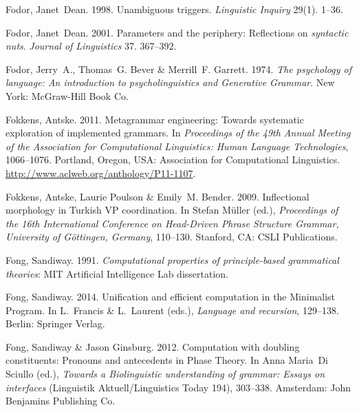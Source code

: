 \begin{thebibliography}{1420}
Fodor, Janet~Dean. 1998{}.
\newblock Unambiguous triggers.
\newblock \emph{Linguistic Inquiry} 29(1). 1--36.

Fodor, Janet~Dean. 2001.
\newblock Parameters and the periphery: Reflections on {\emph{syntactic nuts}}.
\newblock \emph{Journal of Linguistics} 37. 367--392.

Fodor, Jerry~A., Thomas~G. Bever \& Merrill~F. Garrett. 1974.
\newblock \emph{The psychology of language: {An} introduction to
  psycholinguistics and {Generative Grammar}}.
\newblock New York: McGraw-Hill Book Co.

Fokkens, Antske. 2011.
\newblock Metagrammar engineering: {Towards} systematic exploration of
  implemented grammars.
\newblock In \emph{Proceedings of the {49th Annual Meeting of the Association
  for Computational Linguistics: Human Language Technologies}}, 1066--1076.
  Portland, Oregon, USA: Association for Computational Linguistics.
\newblock \urlprefix\url{http://www.aclweb.org/anthology/P11-1107}.

Fokkens, Antske, Laurie Poulson \& Emily~M. Bender. 2009.
\newblock Inflectional morphology in {Turkish} {VP} coordination.
\newblock In Stefan M{\"u}ller (ed.), \emph{Proceedings of the {16th
  International Conference on Head-Driven Phrase Structure Grammar, University
  of G{\"o}ttingen, Germany}}, 110--130. Stanford, CA: CSLI Publications.

Fong, Sandiway. 1991.
\newblock \emph{Computational properties of principle-based grammatical
  theories}: MIT Artificial Intelligence Lab dissertation.

Fong, Sandiway. 2014.
\newblock Unification and efficient computation in the {Minimalist Program}.
\newblock In L.~Francis \& L.~Laurent (eds.), \emph{Language and recursion},
  129--138. Berlin: Springer Verlag.

Fong, Sandiway \& Jason Ginsburg. 2012.
\newblock Computation with doubling constituents: {Pronouns} and antecedents in
  {Phase Theory}.
\newblock In Anna Maria~Di Sciullo (ed.), \emph{Towards a {Biolinguistic}
  understanding of grammar: {Essays} on interfaces} (Linguistik
  Aktuell/Linguistics Today 194), 303--338. Amsterdam: John Benjamins
  Publishing Co.


\end{thebibliography}
